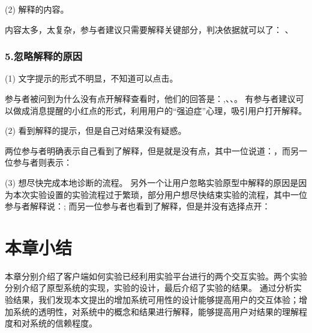(2) 解释的内容。

内容太多，太复杂，参与者建议只需要解释关键部分，判决依据就可以了：
、

\subsubsection{5.忽略解释的原因}
(1) 文字提示的形式不明显，不知道可以点击。

参与者被问到为什么没有点开解释查看时，他们的回答是：,、、。
有参与者建议可以做成消息提醒的小红点的形式，利用用户的“强迫症”心理，吸引用户打开解释。

(2) 看到解释的提示，但是自己对结果没有疑惑。

两位参与者明确表示自己看到了解释，但是就是没有点，其中一位说道：，而另一位参与者则表示：


(3) 想尽快完成本地诊断的流程。
 另外一个让用户忽略实验原型中解释的原因是因为本次实验设置的实验流程过于繁琐，部分用户想尽快结束实验的流程，其中一位参与者解释说：;
 而另一位参与者也看到了解释，但是并没有选择点开：


\section{本章小结}

本章分别介绍了客户端如何实验已经利用实验平台进行的两个交互实验。两个实验分别介绍了原型系统的实现，实验的设计，最后介绍了实验的结果。
通过分析实验结果，我们发现本文提出的增加系统可用性的设计能够提高用户的交互体验；增加系统的透明性，对系统中的概念和结果进行解释，能够提高用户对结果的理解程度和对系统的信赖程度。


